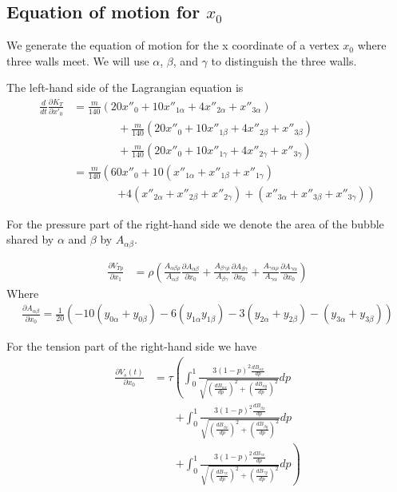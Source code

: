 \documentclass{article}
\begin{document}
\subsection{Equation of motion for $x_0$}
We generate the equation of motion for the x coordinate of a vertex $x_0$ where
three walls meet. We will use $\alpha$, $\beta$, and $\gamma$ to distinguish the
three walls.

The left-hand side of the Lagrangian equation is 
\begin{align}
\frac{d}{d t} \frac{\partial K_T}{\partial x'_0}&=
\frac{m}{140}  \left( 20x''_0+10x''_{1\alpha}+4x''_{2\alpha}+x''_{3\alpha} \right)\\
&\qquad\qquad +\frac{m}{140}\left(
20x''_0+10x''_{1\beta}+4x''_{2\beta}+x''_{3\beta}\right)\nonumber\\ 
&\qquad\qquad +\frac{m}{140} \left(
20x''_0+10x''_{1\gamma}+4x''_{2\gamma}+x''_{3\gamma} \right)\nonumber\\
 &=\frac{m}{140} \left(
60x''_0
+10(x''_{1\alpha}+x''_{1\beta}+x''_{1\gamma})\right.\nonumber\\
&\qquad\qquad \left.+4(x''_{2\alpha}+x''_{2\beta}+x''_{2\gamma})
+(x''_{3\alpha}+x''_{3\beta}+x''_{3\gamma}) \right)\nonumber
\end{align}

For the pressure part of the right-hand side we denote the area of the bubble
shared by $\alpha$ and $\beta$ by $A_{\alpha\beta}$.

\begin{align*}
\frac{\partial V_{Tp}}{\partial x_1} &= 
\rho \left(
\frac{A_{\alpha\beta\rho}}{A_{\alpha\beta}} \frac{\partial
A_{\alpha\beta}}{\partial x_0} 
+\frac{A_{\beta\gamma\rho}}{A_{\beta\gamma}} \frac{\partial
A_{\beta\gamma}}{\partial x_0} 
+\frac{A_{\gamma\alpha\rho}}{A_{\gamma\alpha}} \frac{\partial
A_{\gamma\alpha}}{\partial x_0} 
\right)
\end{align*}
Where
\begin{align*}
\frac{\partial A_{\alpha\beta}}{\partial x_0}=\frac{1}{20}
\left(-10(y_{0\alpha}+y_{0\beta})-6(y_{1\alpha}y_{1\beta})
-3(y_{2\alpha}+y_{2\beta})-(y_{3\alpha}+y_{3\beta})\right)
\end{align*}

For the tension part of the right-hand side we have
\begin{align*}
\frac{\partial V_s(t)}{\partial x_0}&=
\tau\left(\int_0^1\frac{3(1-p)^2  \frac{d B_{\alpha x}}{dp}}{
  \sqrt{\left(\frac{d B_{\alpha x}}{dp}\right)^2+\left(\frac{d
B_{\alpha y}}{dp}\right)^2}} dp\right.\\
&\qquad \left.+\int_0^1\frac{3(1-p)^2  \frac{d B_{\beta x}}{dp}}{
  \sqrt{\left(\frac{d B_{\beta x}}{dp}\right)^2+\left(\frac{d
B_{\beta y}}{dp}\right)^2}} dp\right.\\
&\qquad \left.+\int_0^1\frac{3(1-p)^2  \frac{d B_{\gamma x}}{dp}}{
  \sqrt{\left(\frac{d B_{\gamma x}}{dp}\right)^2+\left(\frac{d
B_{\gamma y}}{dp}\right)^2}} dp
\right)
\end{align*}
\end{document}

